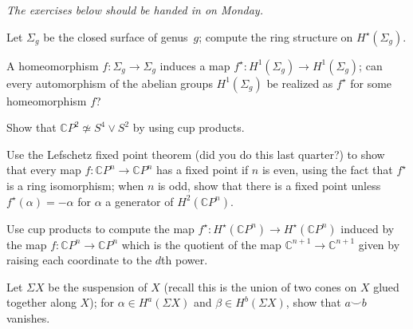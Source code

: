 \documentclass[12pt]{pset}
\author{Jim Fowler}
\date{Spring 2012}
\newcommand{\CC}{\mathbb{C}}
\newcommand{\CP}{\mathbb{C}P}
\begin{document}
\maketitle

\noindent\textit{The exercises below should be handed in on Monday.}

\begin{problem}[Surfaces]
Let $\Sigma_g$ be the closed surface of genus~$g$; compute the ring structure on $H^\star(\Sigma_g)$.
\end{problem}

\begin{problem}
  A homeomorphism $f : \Sigma_g \to \Sigma_g$ induces a map $f^\star :
  H^1(\Sigma_g) \to H^1(\Sigma_g)$; can every automorphism of the
  abelian groups $H^1(\Sigma_g)$ be realized as $f^\star$ for some
  homeomorphism $f$?
\end{problem}

\begin{problem}
  Show that $\CP^2 \not\simeq S^4 \vee S^2$ by using cup products.
\end{problem}

\begin{problem}
  Use the Lefschetz fixed point theorem (did you do this last
  quarter?) to show that every map $f : \CP^n \to \CP^n$ has a fixed
  point if $n$ is even, using the fact that $f^\star$ is a ring
  isomorphism; when $n$ is odd, show that there is a fixed point
  unless $f^\star(\alpha) = -\alpha$ for $\alpha$ a generator of
  $H^2(\CP^n)$.
\end{problem}

\begin{problem}
  Use cup products to compute the map $f^\star : H^\star(\CP^n) \to
  H^\star(\CP^n)$ induced by the map $f : \CP^n \to \CP^n$ which is
  the quotient of the map $\CC^{n+1} \to \CC^{n+1}$ given by raising
  each coordinate to the $d$th power.
\end{problem}

\begin{problem}
  Let $\Sigma X$ be the suspension of $X$ (recall this is the union of
  two cones on $X$ glued together along $X$); for $\alpha \in
  H^a(\Sigma X)$ and $\beta \in H^b(\Sigma X)$, show that $a \smile b$
  vanishes.
\end{problem}
\end{document}
